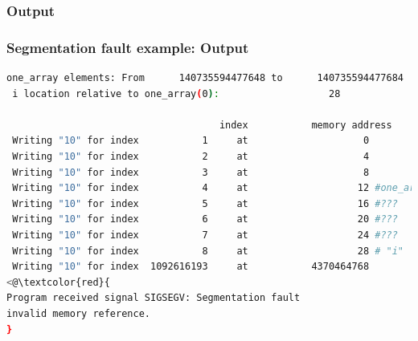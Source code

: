 \documentclass[t]{myBeamer}
\begin{document}
\subsubsection{Output} 
\begin{frame}[fragile,t]
\frametitle{ \huge Segmentation fault example: Output}
\vspace{-10pt}
\begin{lstlisting}[language=bash]
 one_array elements: From      140735594477648 to      140735594477684
 i location relative to one_array(0):                   28

                                     index           memory address
 Writing "10" for index           1     at                    0
 Writing "10" for index           2     at                    4
 Writing "10" for index           3     at                    8
 Writing "10" for index           4     at                   12 #one_array(4)
 Writing "10" for index           5     at                   16 #???
 Writing "10" for index           6     at                   20 #???
 Writing "10" for index           7     at                   24 #???
 Writing "10" for index           8     at                   28 # "i"
 Writing "10" for index  1092616193     at           4370464768
<@\textcolor{red}{
Program received signal SIGSEGV: Segmentation fault
invalid memory reference.
}
\end{lstlisting}


\end{frame} 
\end{document}
